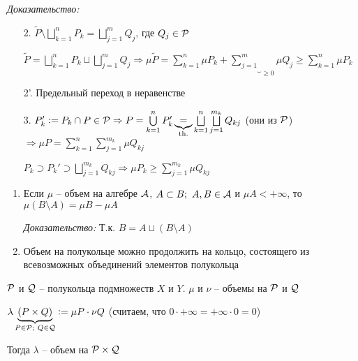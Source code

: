 \documentclass[12pt]{article}
\begin{document}
\textit{Доказательство:}

\begin{enumerate}
    \item[2.] $\tilde{P} \setminus \bigsqcup\limits_{k = 1}^n P_k = \bigsqcup\limits_{j = 1}^m Q_j$, где $Q_j \in \P$
    
    $\tilde{P} = \bigsqcup\limits_{k = 1}^n P_k \sqcup \bigsqcup\limits_{j = 1}^m Q_j \Rightarrow \mu \tilde{P} = \sum\limits_{k = 1}^n \mu P_k + \underbrace{\sum\limits_{j = 1}^m}_{\geq 0} \mu Q_j \geq \sum\limits_{k = 1}^n \mu P_k$

    \item[2'.] Предельный переход в неравенстве
    
    \item[3.] $P'_k := P_k \cap P \in \P \Rightarrow P = \bigcup\limits_{k = 1}^n P_k' \underbrace{=}_\text{th.} \bigsqcup\limits_{k = 1}^n \bigsqcup\limits_{j = 1}^{m_k} Q_{kj}$ (они из $\P$) $\Rightarrow \mu P = \sum\limits_{k = 1}^n \sum\limits_{j = 1}^{m_k} \mu Q_{kj}$
    
    $P_k \supset P_k' \supset \bigsqcup\limits_{j = 1}^{m_k} Q_{kj} \Rightarrow \mu P_k \geq \sum\limits_{j = 1}^{m_k} \mu Q_{kj}$
\end{enumerate}

\begin{Remark}{}
    \begin{enumerate}
        \item Если $\mu$ -- объем на алгебре $\A$, $A \subset B;\ A, B \in \A$ и $\mu A < + \infty$, то $\mu (B \setminus A) = \mu B - \mu A$
        
        \textit{Доказательство:} Т.к. $B = A \sqcup (B \setminus A)$

        \item Объем на полукольце можно продолжить на кольцо, состоящего из всевозможных объединений элементов полукольца
    \end{enumerate}
\end{Remark}

\begin{theo}{}
    $\P$ и $\QQ$ -- полукольца подмножеств $X$ и $Y$. $\mu$ и $\nu$ -- объемы на $\P$ и $\QQ$

    $\lambda \underbrace{(P \times Q)}_{P \in \P;\ Q \in \QQ} := \mu P \cdot \nu Q$ (считаем, что $0 \cdot + \infty = + \infty \cdot 0 = 0$)

    Тогда $\lambda$ -- объем на $\P \times \QQ$
\end{theo}
\end{document}
